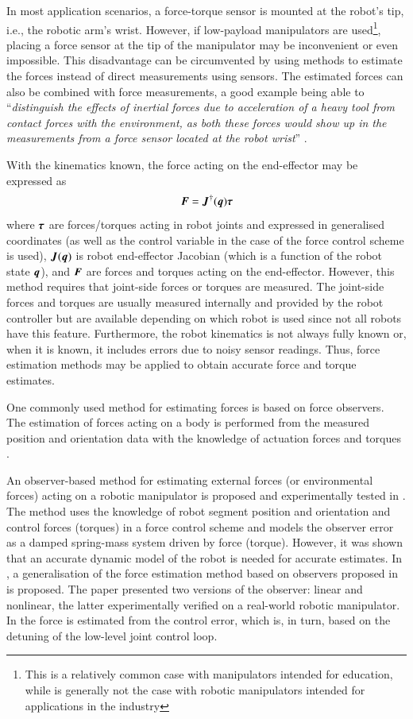 In most application scenarios, a force-torque sensor is mounted at the robot's tip, i.e., the robotic arm's wrist. However, if low-payload manipulators are used\footnote{This is a relatively common case with manipulators intended for education, while is generally not the case with robotic manipulators intended for applications in the industry}, placing a force sensor at the tip of the manipulator may be inconvenient or even impossible. This disadvantage can be circumvented by using methods to estimate the forces instead of direct measurements using sensors. The estimated forces can also be combined with force measurements, a good example being able to ``\emph{distinguish the effects of inertial forces due to acceleration of a heavy tool from contact forces with the environment, as both these forces would show up in the measurements from a force sensor located at the robot wrist}'' \cite{Alcocer2003}.

With the kinematics known, the force acting on the end-effector may be expressed as 
\[
    {\bm{F}} = {\bm{J}}^\dagger({\bm{q}}){\bm{\tau}}
\]
where ${\bm{\tau}}$ are forces/torques acting in robot joints and expressed in generalised coordinates (as well as the control variable in the case of the force control scheme is used), ${\bm{J}}({\bm{q}})$ is robot end-effector Jacobian (which is a function of the robot state ${\bm{q}}$), and ${\bm{F}}$ are forces and torques acting on the end-effector. However, this method requires that joint-side forces or torques are measured. The joint-side forces and torques are usually measured internally and provided by the robot controller but are available depending on which robot is used since not all robots have this feature. Furthermore, the robot kinematics is not always fully known or, when it is known, it includes errors due to noisy sensor readings. Thus, force estimation methods may be applied to obtain accurate force and torque estimates. 

One commonly used method for estimating forces is based on force observers. The estimation of forces acting on a body is performed from the measured position and orientation data with the knowledge of actuation forces and torques \cite{Hacksel1994,Ohishi1991,Eom1998,Alcocer2003,Stolt2012}.

An observer-based method for estimating external forces (or environmental forces) acting on a robotic manipulator is proposed and experimentally tested in \cite{Hacksel1994}. The method uses the knowledge of robot segment position and orientation and control forces (torques) in a force control scheme and models the observer error as a damped spring-mass system driven by force (torque). However, it was shown that an accurate dynamic model of the robot is needed for accurate estimates. In \cite{Alcocer2003}, a generalisation of the force estimation method based on observers proposed in \cite{Hacksel1994} is proposed. The paper presented two versions of the observer: linear and nonlinear, the latter experimentally verified on a real-world robotic manipulator. In \cite{Stolt2012} the force is estimated from the control error, which is, in turn, based on the detuning of the low-level joint control loop.


